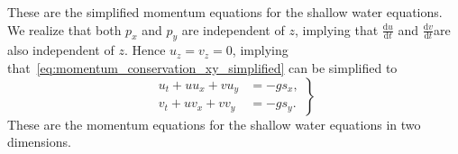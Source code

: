 These are the simplified momentum equations for the shallow water equations.
We realize that both $p_x$ and $p_y$ are independent of $z$, implying that $\frac{\text{d}u}{\text{d}t} $ and $\frac{\text{d}v}{\text{d}t} $are also independent of $z$.
Hence $u_z = v_z = 0$, implying that~\eqref{eq:momentum_conservation_xy_simplified} can be simplified to
\begin{equation}\label{eq:momentum_conservation_xy_final}
    \left.
    \begin{aligned}
        u_t + u u_x + v u_y &= -g s_x,  \\
        v_t + u v_x + v v_y &= -g s_y.
    \end{aligned}
    \right\}
\end{equation}
These are the momentum equations for the shallow water equations in two dimensions.

